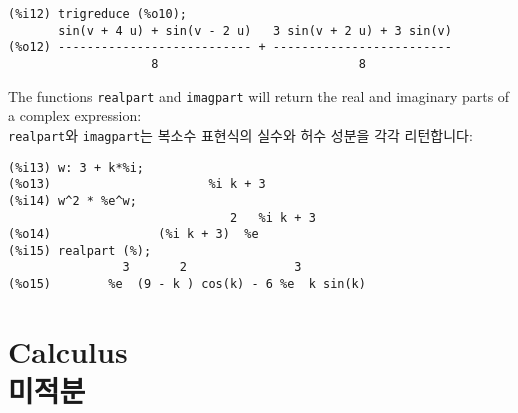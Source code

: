 \documentclass[a4paper,12pt]{article}
\begin{document}
\begin{verbatim}
(%i12) trigreduce (%o10);
       sin(v + 4 u) + sin(v - 2 u)   3 sin(v + 2 u) + 3 sin(v)
(%o12) --------------------------- + -------------------------
                    8                            8
\end{verbatim}
The functions {\tt realpart} and {\tt imagpart} will return the real 
and imaginary parts of a complex expression: \\
{\tt realpart}와 {\tt imagpart}는 복소수 표현식의 실수와 허수 성분을 
각각 리턴합니다:
\begin{verbatim}
(%i13) w: 3 + k*%i;
(%o13)                      %i k + 3
(%i14) w^2 * %e^w;
                               2   %i k + 3
(%o14)               (%i k + 3)  %e
(%i15) realpart (%);
                3       2               3
(%o15)        %e  (9 - k ) cos(k) - 6 %e  k sin(k)
\end{verbatim}

\section{Calculus \\ 미적분 \label{sec:calculus}}
\end{document}
